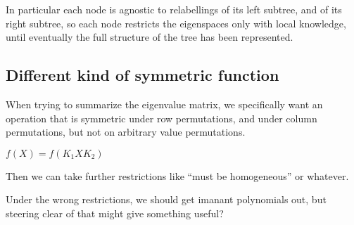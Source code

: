\documentclass{report}
\begin{document}
In particular each node is agnostic to relabellings of its left subtree, and of
its right subtree, so each node restricts the eigenspaces only with local
knowledge, until eventually the full structure of the tree has been
represented.

\subsection{Different kind of symmetric function}

When trying to summarize the eigenvalue matrix, we specifically want an
operation that is symmetric under row permutations, and under column
permutations, but not on arbitrary value permutations.

$f(X) = f(K_1XK_2)$

Then we can take further restrictions like ``must be homogeneous'' or whatever.

Under the wrong restrictions, we should get imanant polynomials out, but
steering clear of that might give something useful?
\end{document}
